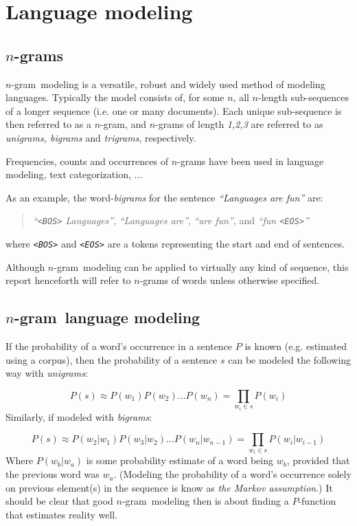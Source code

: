 \documentclass[a4paper,11pt]{kth-mag}
\newcommand{\todo}{ ... }
\newcommand{\ngram}{$n$-gram}
\begin{document}
\section{Language modeling}

\subsection{\ngram s}
\label{subsec:ngrams}
\ngram~modeling is a versatile, robust and widely used method of modeling languages. Typically the model consists of, for some $n$, all $n$-length sub-sequences of a longer sequence (i.e. one or many documents). Each unique sub-sequence is then referred to as a \ngram, and \ngram s of length \emph{1,2,3} are referred to as \emph{unigrams, bigrams} and \emph{trigrams}, respectively\cite{ngrams}.

Frequencies, counts and occurrences of \ngram s have been used in language modeling\cite{chen_goodman}, text categorization\cite{ngrams}, \todo

As an example, the word-\emph{bigrams} for the sentence \emph{``Languages are fun''} are:
\begin{quote}
  \vspace*{0.1cm}
  \centering
\emph{``\texttt{<BOS>} Languages''}, \emph{``Languages are''}, \emph{``are fun''}, and \emph{``fun \texttt{<EOS>}''}
\end{quote}
where \emph{\texttt{<BOS>}} and \emph{\texttt{<EOS>}} are a tokens representing the start and end of sentences.

Although \ngram~modeling can be applied to virtually any kind of sequence, this report henceforth will refer to \ngram s of words unless otherwise specified.

\subsection{\ngram~language modeling}
If the probability of a word's occurrence in a sentence $P$ is known (e.g. estimated using a corpus), then the probability of a sentence $s$ can be modeled the following way with \emph{unigrams}:

\begin{equation} \label{eq:unigram_chain_prob}
P(s) \approx P(w_1) P(w_2) \dots P(w_n) =\prod_{w_i \in s}P(w_i)
\end{equation}
Similarly, if modeled with \emph{bigrams}:

\begin{equation} \label{eq:bigram_chain_prob}
P(s) \approx P(w_2 | w_1)P(w_3 | w_2) \dots P(w_n | w_{n-1}) = \prod_{w_i \in s}P(w_i|w_{i-1})
\end{equation}
Where $P(w_b | w_a)$ is some probability estimate of a word being $w_b$, provided that the previous word was $w_a$. (Modeling the probability of a word's occurrence solely on previous element(s) in the sequence is know as \emph{the Markov assumption}.) It should be clear that good \ngram~modeling then is about finding a $P$-function that estimates reality well.
\end{document}
